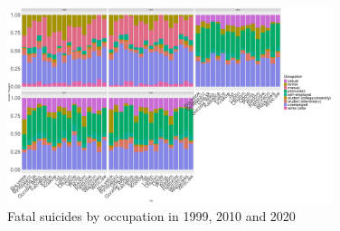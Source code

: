 \documentclass{article}
\begin{document}

\begin{figure}[H]
    \centering
    \includegraphics[width=0.85\textwidth]{imgs/job_city_fat_suicides-991020.pdf}
    \caption{Fatal suicides by occupation in 1999, 2010 and 2020}
    \label{fig:job_city_fat_suicides-991020}
\end{figure}
\end{document}
